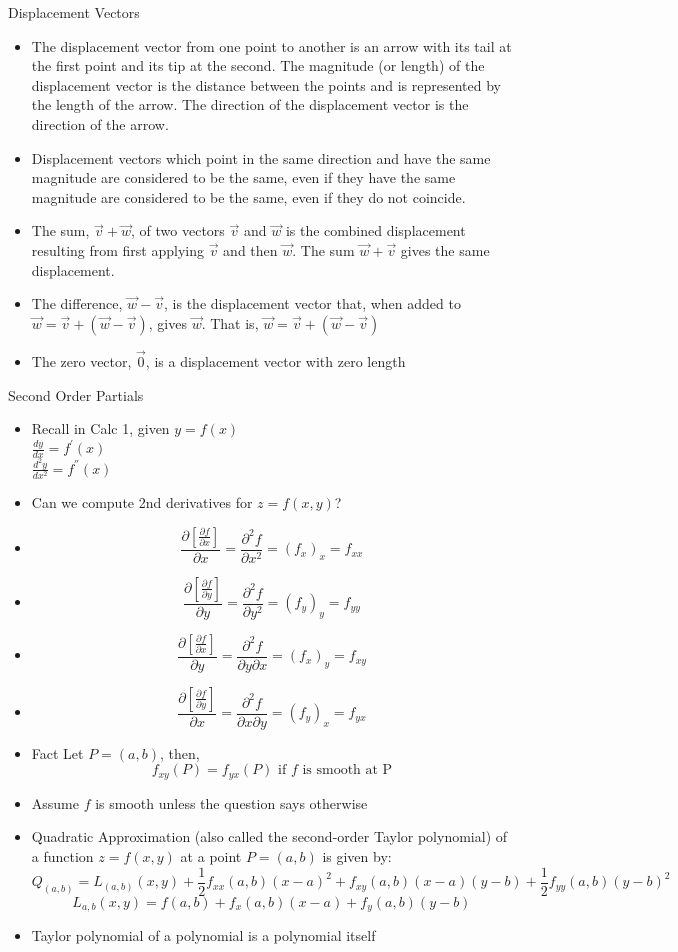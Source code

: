 \documentclass[12pt,letterpaper, onecolumn]{exam}
\begin{document}
		 Displacement Vectors
		\begin{itemize}
			\item The displacement vector from one point to another is an arrow with its tail at the first point and its tip at the second. The magnitude (or length) of the displacement vector is the distance between the points and is represented by the length of the arrow. The direction of the displacement vector is the direction of the arrow.
			\item Displacement vectors which point in the same direction and have the same magnitude are considered to be the same, even if they have the same magnitude are considered to be the same, even if they do not coincide.
			\item The sum, $\vec{v}+\vec{w}$, of two vectors $\vec{v}$ and $\vec{w}$ is the combined displacement resulting from first applying $\vec{v}$ and then $\vec{w}$. The sum $\vec{w}+\vec{v}$ gives the same displacement.
			\item The difference, $\vec{w}-\vec{v}$, is the displacement vector that, when added to $\vec{w}=\vec{v}+(\vec{w}-\vec{v})$, gives $\vec{w}$. That is, $\vec{w}=\vec{v}+(\vec{w}-\vec{v})$
			\item The zero vector, $\vec{0}$, is a displacement vector with zero length
		\end{itemize}
		\noindent Second Order Partials
		\begin{itemize}
			\item Recall in Calc 1, given $y=f(x)$\\
			$\frac{dy}{dx}=f^{'}(x)$\\
						$\frac{d^2y}{dx^2}=f^{''}(x)$
					\item Can we compute 2nd derivatives for $z=f(x,y)$?
					\item $$\frac{\partial\left[\frac{\partial f}{\partial x}\right] }{\partial x}=\frac{\partial^2 f}{\partial x^2}=(f_x)_x=f_{xx}$$
					\item $$\frac{\partial\left[\frac{\partial f}{\partial y}\right] }{\partial y}=\frac{\partial^2 f}{\partial y^2}=(f_y)_y=f_{yy}$$
						\item $$\frac{\partial\left[\frac{\partial f}{\partial x}\right] }{\partial y}=\frac{\partial^2 f}{\partial y\partial x}=(f_x)_y=f_{xy}$$
							\item $$\frac{\partial\left[\frac{\partial f}{\partial y}\right] }{\partial x}=\frac{\partial^2 f}{\partial x\partial y}=(f_y)_x=f_{yx}$$
							\item Fact Let $P=(a,b)$, then, 
							$$f_{xy}(P)=f_{yx}(P) \textrm{ if $f$ is smooth at P}$$
							\item Assume $f$ is smooth unless the question says otherwise 
							\item Quadratic Approximation (also called the second-order Taylor polynomial) of a function $z=f(x,y)$ at a point $P=(a,b)$ is given by:
							$$Q_{(a,b)}=L_{(a,b)}(x,y)+\frac{1}{2}f_{xx}(a,b)(x-a)^2+f_{xy}(a,b)(x-a)(y-b)+\frac{1}{2}f_{yy}(a,b)(y-b)^2$$
							$$L_{a,b}(x,y)=f(a,b)+f_x(a,b)(x-a)+f_y(a,b)(y-b)$$
							\item Taylor polynomial of a polynomial is a polynomial itself
		\end{itemize}
\end{document}
